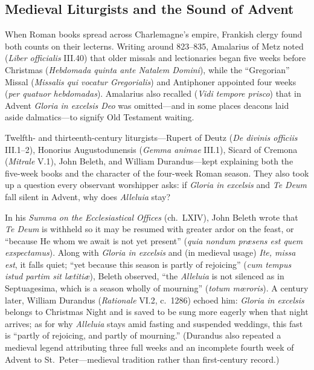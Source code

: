 \subsection{Medieval Liturgists and the Sound of Advent}

When Roman books spread across Charlemagne's empire, Frankish clergy found
both counts on their lecterns. Writing around 823--835, Amalarius of Metz
noted (\textit{Liber officialis} III.40) that older missals and
lectionaries began five weeks before Christmas (\textit{Hebdomada quinta
ante Natalem Domini}), while the ``Gregorian'' Missal (\textit{Missalis qui
vocatur Gregorialis}) and Antiphoner appointed four weeks (\textit{per
quatuor hebdomadas}). Amalarius also recalled (\textit{Vidi tempore
prisco}) that in Advent \textit{Gloria in excelsis Deo} was omitted---and
in some places deacons laid aside dalmatics---to signify Old Testament
waiting.

Twelfth- and thirteenth-century liturgists---Rupert of Deutz (\textit{De
divinis officiis} III.1--2), Honorius Augustodunensis (\textit{Gemma
animae} III.1), Sicard of Cremona (\textit{Mitrale} V.1), John Beleth, and
William Durandus---kept explaining both the five-week books and the
character of the four-week Roman season. They also took up a question every
observant worshipper asks: if \textit{Gloria in excelsis} and \textit{Te
Deum} fall silent in Advent, why does \textit{Alleluia} stay?

In his \textit{Summa on the Ecclesiastical Offices} (ch.\ LXIV), John
Beleth wrote that \textit{Te Deum} is withheld so it may be resumed with
greater ardor on the feast, or ``because He whom we await is not yet
present'' (\textit{quia nondum pr\ae sens est quem exspectamus}). Along
with \textit{Gloria in excelsis} and (in medieval usage) \textit{Ite, missa
est}, it falls quiet; ``yet because this season is partly of rejoicing''
(\textit{cum tempus istud partim sit l\ae titi\ae}), Beleth observed,
``the \textit{Alleluia} is not silenced as in Septuagesima, which is a
season wholly of mourning'' (\textit{totum m\oe roris}). A century later,
William Durandus (\textit{Rationale} VI.2, c.\ 1286) echoed him:
\textit{Gloria in excelsis} belongs to Christmas Night and is saved to be
sung more eagerly when that night arrives; as for why \textit{Alleluia}
stays amid fasting and suspended weddings, this fast is ``partly of
rejoicing, and partly of mourning.'' (Durandus also repeated a medieval
legend attributing three full weeks and an incomplete fourth week of Advent
to St.~Peter---medieval tradition rather than first-century record.)

